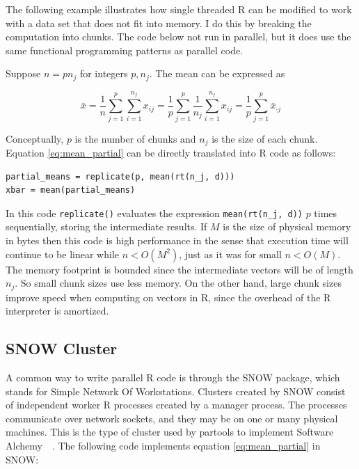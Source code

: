 \documentclass[12pt]{article}
\begin{document}
The following example illustrates how single threaded R can be modified to
work with a data set that does not fit into memory. I do this 
by breaking the computation into chunks. The code below not run in parallel,
but it does use the same functional programming patterns as parallel code. 

Suppose $n = p n_j$ for integers $p, n_j$.  The mean can be
expressed as 

\begin{equation}
    \bar{x} = \frac{1}{n} \sum_{j = 1}^p \sum_{i = 1}^{n_j} x_{ij}
    = \frac{1}{p} \sum_{j = 1}^p \frac{1}{n_j} \sum_{i = 1}^{n_j} x_{ij}
    = \frac{1}{p} \sum_{j = 1}^p \bar{x}_{\cdot j}
\label{eq:mean_partial}
\end{equation}

Conceptually, $p$ is the number of chunks and $n_j$ is the size of each
chunk. Equation \ref{eq:mean_partial} can be directly translated into R
code as follows:

\begin{verbatim}
partial_means = replicate(p, mean(rt(n_j, d)))
xbar = mean(partial_means)
\end{verbatim}

In this code \texttt{replicate()} evaluates the expression
\texttt{mean(rt(n\_j, d))} $p$ times sequentially, storing the intermediate
results.  If $M$ is the size of physical memory in bytes then this code is
high performance in the sense that execution time will continue to be
linear while $n < O(M^2)$, just as it was for small $n < O(M)$. The memory
footprint is bounded since the intermediate vectors will be of length
$n_j$. So small chunk sizes use less memory. On the other hand, large chunk
sizes improve speed when computing on vectors in R, since the overhead of
the R interpreter is amortized. 



\subsection{SNOW Cluster}

A common way to write parallel R code is through the SNOW package, which
stands for Simple Network Of Workstations.  Clusters created by SNOW
consist of independent worker R processes created by a manager process. The
processes communicate over network sockets, and they may be on one or many
physical machines.  This is the type of cluster used by partools to
implement Software Alchemy~\cite{R-partools}~\cite{matloff2014software}.
The following code implements equation \ref{eq:mean_partial} in SNOW:
\end{document}
